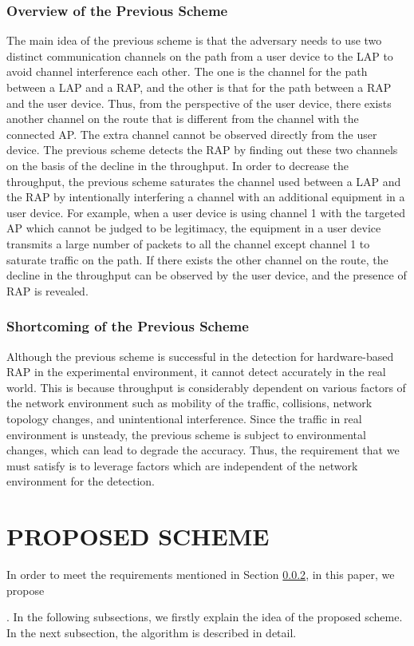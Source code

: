 \documentclass[conference]{IEEEtran}
\begin{document}
\subsubsection{Overview of the Previous Scheme}
The main idea of the previous scheme \cite{previous} is that the adversary needs to use two distinct communication channels on the path from a user device to the LAP to avoid channel interference each other.
The one is the channel for the path between a LAP and a RAP, and the other is that for the path between a RAP and the user device.
Thus, from the perspective of the user device, there exists another channel on the route that is different from the channel with the connected AP.
The extra channel cannot be observed directly from the user device.
The previous scheme detects the RAP by finding out these two channels on the basis of the decline in the throughput.
In order to decrease the throughput, the previous scheme saturates the channel used between a LAP and the RAP by intentionally interfering a channel with an additional equipment in a user device.
For example, when a user device is using channel 1 with the targeted AP which cannot be judged to be legitimacy, the equipment in a user device transmits a large number of packets to all the channel except channel 1 to saturate traffic on the path.
If there exists the other channel on the route, the decline in the throughput can be observed by the user device, and the presence of RAP is revealed.

\subsubsection{Shortcoming of the Previous Scheme}\label{sec:shortcoming}
Although the previous scheme is successful in the detection for hardware-based RAP in the experimental environment, it cannot detect accurately in the real world.
This is because throughput is considerably dependent on various factors of the network environment such as mobility of the traffic, collisions, network topology changes, and unintentional interference.
Since the traffic in real environment is unsteady, the previous scheme is subject to environmental changes, which can lead to degrade the accuracy.
Thus, the requirement that we must satisfy is to leverage factors which are independent of the network environment for the detection.

\section{PROPOSED SCHEME}
In order to meet the requirements mentioned in Section \ref{sec:shortcoming}, in this paper, we propose \title{}.
In the following subsections, we firstly explain the idea of the proposed scheme.
In the next subsection, the algorithm is described in detail.
\end{document}

